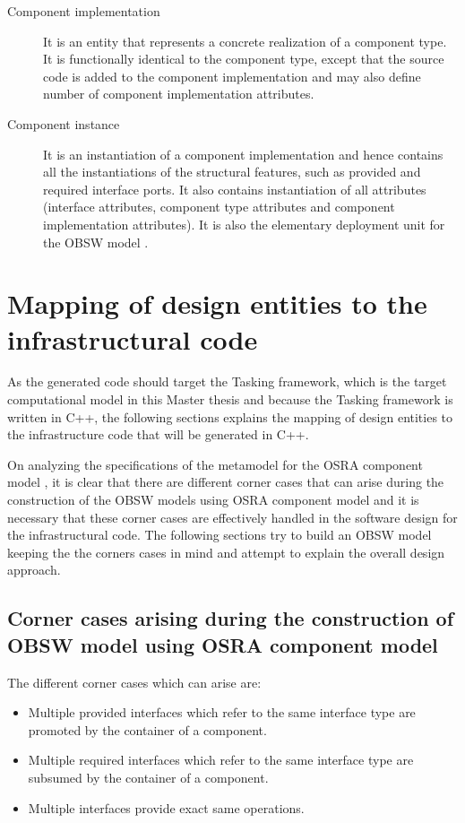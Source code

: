 \begin{description}
\item [Component implementation] It is an entity that represents a concrete realization of a component type. It is functionally identical to the component type, except that the source code is added to the component implementation and may also define number of component implementation attributes.

\item [Component instance] It is an instantiation of a component implementation and hence contains all the instantiations of the structural features, such as provided and required interface ports. It also contains instantiation of all attributes (interface attributes, component type attributes and component implementation attributes). It is also the elementary deployment unit for the OBSW model \cite{SpecMetamodel}.        
\end{description}

\section{Mapping of design entities to the infrastructural code}
As the generated code should target the Tasking framework, which is the target computational model in this Master thesis and because the Tasking framework is written in C++, the following sections explains the mapping of design entities to the infrastructure code that will be generated in C++.

On analyzing the specifications of the metamodel for the OSRA component model \cite{SpecMetamodel}, it is clear that there are different corner cases that can arise during the construction of the OBSW models using OSRA component model and it is necessary that these corner cases are effectively handled in the software design for the infrastructural code. The following sections try to build an OBSW model keeping the the corners cases in mind and attempt to explain the overall design approach.

\subsection{Corner cases arising during the construction of OBSW model using OSRA component model}
\label{section: Corner cases}
The different corner cases which can arise are:

\begin{itemize}
\item Multiple provided interfaces which refer to the same interface type are promoted by the container of a component.
\item Multiple required interfaces which refer to the same interface type are subsumed by the container of a component.
\item Multiple interfaces provide exact same operations.
\end{itemize}

